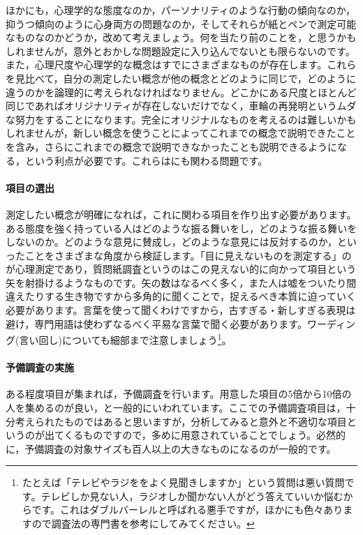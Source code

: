 \documentclass{ltjsbook}
\begin{document}
ほかにも，心理学的な態度なのか，パーソナリティのような行動の傾向なのか，抑うつ傾向のように心身両方の問題なのか，そしてそれらが紙とペンで測定可能なものなのかどうか，改めて考えましょう。何を当たり前のことを，と思うかもしれませんが，意外とおかしな問題設定に入り込んでないとも限らないのです。また，心理尺度や心理学的な概念はすでにさまざまなものが存在します。これらを見比べて，自分の測定したい概念が他の概念とどのように同じで，どのように違うのかを論理的に考えられなければなりません。どこかにある尺度とほとんど同じであればオリジナリティが存在しないだけでなく，車輪の再発明というムダな努力をすることになります。完全にオリジナルなものを考えるのは難しいかもしれませんが，新しい概念を使うことによってこれまでの概念で説明できたことを含み，さらにこれまでの概念で説明できなかったことも説明できるようになる，という利点が必要です。これらはにも関わる問題です。

\paragraph{項目の選出}測定したい概念が明確になれば，これに関わる項目を作り出す必要があります。ある態度を強く持っている人はどのような振る舞いをし，どのような振る舞いをしないのか。どのような意見に賛成し，どのような意見には反対するのか，といったことをさまざまな角度から検証します。「目に見えないものを測定する」のが心理測定であり，質問紙調査というのはこの見えない的に向かって項目という矢を射掛けるようなものです。矢の数はなるべく多く，また人は嘘をついたり間違えたりする生き物ですから多角的に聞くことで，捉えるべき本質に迫っていく必要があります。言葉を使って聞くわけですから，古すぎる・新しすぎる表現は避け，専門用語は使わずなるべく平易な言葉で聞く必要があります。ワーディング(言い回し)についても細部まで注意しましょう\footnote{たとえば「テレビやラジををよく見聞きしますか」という質問は悪い質問です。テレビしか見ない人，ラジオしか聞かない人がどう答えていいか悩むからです。これはダブルバーレルと呼ばれる悪手ですが，ほかにも色々ありますので調査法の専門書を参考にしてみてください。}。

\paragraph{予備調査の実施}ある程度項目が集まれば，予備調査を行います。用意した項目の5倍から10倍の人を集めるのが良い，と一般的にいわれています\parencite{kosugi2016a}。ここでの予備調査項目は，十分考えられたものではあると思いますが，分析してみると意外と不適切な項目というのが出てくるものですので，多めに用意されていることでしょう。必然的に，予備調査の対象サイズも百人以上の大きなものになるのが一般的です。
\end{document}
